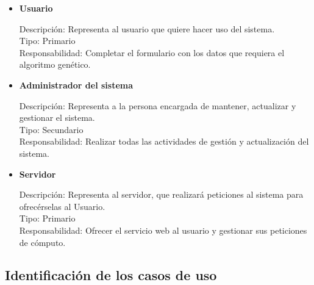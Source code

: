 \begin{itemize}
	\item \textbf{Usuario}
	
	Descripción: Representa al usuario que quiere hacer uso del sistema.\\
	
	Tipo: Primario\\
	
	Responsabilidad: Completar el formulario con los datos que requiera el algoritmo genético.
	
	\item \textbf{Administrador del sistema}
	
	Descripción: Representa a la persona encargada de mantener, actualizar y gestionar el sistema.\\
	
	Tipo: Secundario\\
	
	Responsabilidad: Realizar todas las actividades de gestión y actualización del sistema.
	
	\item \textbf{Servidor}
	
	Descripción: Representa al servidor, que realizará peticiones al sistema para ofrecérselas al Usuario.\\
	
	Tipo: Primario\\
	
	Responsabilidad: Ofrecer el servicio web al usuario y gestionar sus peticiones de cómputo.
	
\end{itemize}




\bigskip
\subsection{Identificación de los casos de uso}
\bigskip

